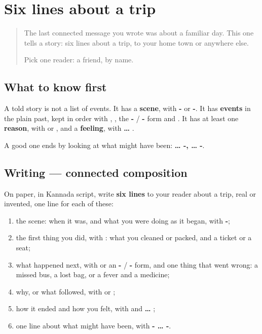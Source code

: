 \section[(six lines)]{Six lines about a trip}

\label{lesson:KA-W318-six-lines}



\begin{quote}
The last connected message you wrote was about a familiar day. This one tells a story: six lines about a trip, to your home town or anywhere else.

Pick one reader: a friend, by name.
\end{quote}

\subsection*{What to know first}
A told story is not a list of events. It has a \textbf{scene}, with \textbf{-} or \textbf{-}. It has \textbf{events} in the plain past, kept in order with \textbf{}, \textbf{ }, the \textbf{-} / \textbf{-} form and \textbf{}. It has at least one \textbf{reason}, with \textbf{} or \textbf{}, and a \textbf{feeling}, with \textbf{ … }.

A good one ends by looking at what might have been: \textbf{… -, … -}.

\subsection*{Writing — connected composition}
On paper, in Kannada script, write \textbf{six lines} to your reader about a trip, real or invented, one line for each of these:

\begin{enumerate}
\raggedright
  \item the scene: when it was, and what you were doing as it began, with \textbf{-};
  \item the first thing you did, with \textbf{}: what you cleaned or packed, and a ticket or a seat;
  \item what happened next, with \textbf{ } or an \textbf{-} / \textbf{-} form, and one thing that went wrong: a missed bus, a lost bag, or a fever and a medicine;
  \item why, or what followed, with \textbf{} or \textbf{};
  \item how it ended and how you felt, with \textbf{} and \textbf{ … };
  \item one line about what might have been, with \textbf{- … -}.
\end{enumerate}

